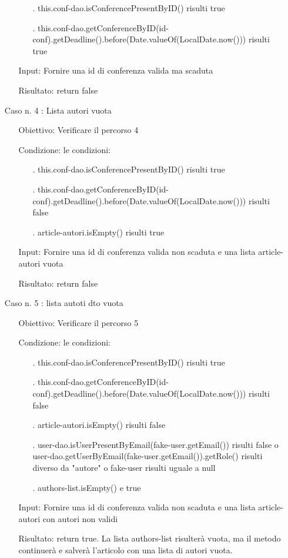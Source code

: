 \begin{itemize}
\begin{itemize}
\begin{itemize}
\item[.]  this.conf-dao.isConferencePresentByID() risulti true
\item[.]  this.conf-dao.getConferenceByID(id-conf).getDeadline().before(Date.valueOf(LocalDate.now())) risulti true 
\end{itemize}
\item[Input:] Fornire una id di conferenza valida ma scaduta
\item[Risultato:] return false
\end{itemize}
\item[Caso n. 4 :] Lista autori vuota
\begin{itemize}
\item[Obiettivo:] Verificare il percorso  4
\item[Condizione:] le condizioni:
\begin{itemize}
\item[.]  this.conf-dao.isConferencePresentByID() risulti true
\item[.]  this.conf-dao.getConferenceByID(id-conf).getDeadline().before(Date.valueOf(LocalDate.now())) risulti false
\item[.]  article-autori.isEmpty() risulti true
\end{itemize}
\item[Input:] Fornire una id di conferenza valida non scaduta e una lista article-autori vuota 
\item[Risultato:] return false
\end{itemize}
\item[Caso n. 5 :] lista autoti dto vuota
\begin{itemize}
\item[Obiettivo:] Verificare il percorso 5
\item[Condizione:] le condizioni: 
\begin{itemize}
\item[.]  this.conf-dao.isConferencePresentByID() risulti true
\item[.]  this.conf-dao.getConferenceByID(id-conf).getDeadline().before(Date.valueOf(LocalDate.now())) risulti false
\item[.]  article-autori.isEmpty() risulti false
\item[.]  user-dao.isUserPresentByEmail(fake-user.getEmail()) risulti false o user-dao.getUserByEmail(fake-user.getEmail()).getRole() risulti diverso da "autore" o  fake-user risulti uguale a null
\item[.]  authors-list.isEmpty() e true
\end{itemize}
\item[Input:]  Fornire una id di conferenza valida non scaduta e una lista article-autori con autori non validi
\item[Risultato:] return true. La lista authors-list risulterà vuota, ma il metodo continuerà e salverà l'articolo con una lista di autori vuota.
\end{itemize}
\end{itemize}



